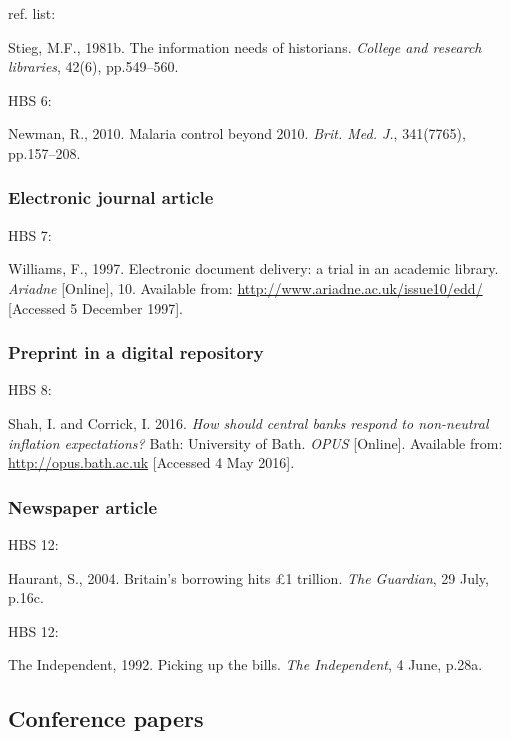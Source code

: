 ref. list: \cite{stieg1981inh}

Stieg, M.F., 1981b. The information needs of historians. \emph{College and research libraries}, 42(6), pp.549--560.


HBS 6: \cite{newman2010mcb}

Newman, R., 2010. Malaria control beyond 2010. \emph{Brit. Med. J.}, 341(7765), pp.157--208.



\subsubsection*{Electronic journal article}

HBS 7: \cite{williams1997edd}

Williams, F., 1997. Electronic document delivery: a trial in an academic library. \emph{Ariadne} [Online], 10. Available from: \url{http://www.ariadne.ac.uk/issue10/edd/} [Accessed 5 December 1997].



\subsubsection*{Preprint in a digital repository}

HBS 8: \cite{shah.corrick2016hsc}

Shah, I. and Corrick, I. 2016. \emph{How should central banks respond to non-neutral inflation expectations?} Bath: University of Bath. \emph{OPUS} [Online]. Available from: \url{http://opus.bath.ac.uk} [Accessed 4 May 2016].



\subsubsection*{Newspaper article}

HBS 12: \cite{haurant2004bbh}

Haurant, S., 2004. Britain's borrowing hits £1 trillion. \emph{The Guardian}, 29 July, p.16c.


HBS 12: \cite{independent1992pub}

The Independent, 1992. Picking up the bills. \emph{The Independent}, 4 June, p.28a.



\subsection{Conference papers}

